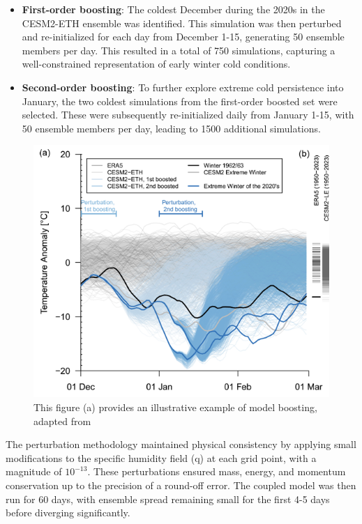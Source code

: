 \documentclass[
]{krantz}
\providecommand{\tightlist}{%
  \setlength{\itemsep}{0pt}\setlength{\parskip}{0pt}}
\begin{document}
\begin{itemize}
\tightlist
\item
  \textbf{First-order boosting}: The coldest December during the 2020s in the CESM2-ETH ensemble was identified. This simulation was then perturbed and re-initialized for each day from December 1-15, generating 50 ensemble members per day. This resulted in a total of 750 simulations, capturing a well-constrained representation of early winter cold conditions.
\item
  \textbf{Second-order boosting}: To further explore extreme cold persistence into January, the two coldest simulations from the first-order boosted set were selected. These were subsequently re-initialized daily from January 1-15, with 50 ensemble members per day, leading to 1500 additional simulations.
\end{itemize}



\begin{figure}

{\centering \includegraphics[width=0.7\linewidth]{work/03-coldex/figures/boosting original} 

}

\caption{This figure (a) provides an illustrative example of model boosting, adapted from \citet{sippel2024}}\label{fig:boosting-example}
\end{figure}

The perturbation methodology maintained physical consistency by applying small modifications to the specific humidity field (q) at each grid point, with a magnitude of \(10^{-13}\). These perturbations ensured mass, energy, and momentum conservation up to the precision of a round-off error. The coupled model was then run for 60 days, with ensemble spread remaining small for the first 4-5 days before diverging significantly.
\end{document}
